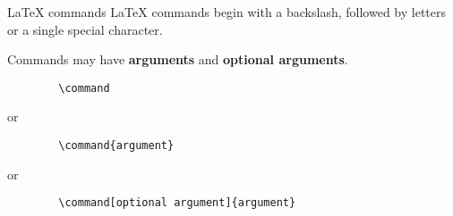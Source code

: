 \begin{frame}[fragile]{LaTeX commands}
    LaTeX commands begin with a backslash, followed by letters or a single special character.

    Commands may have \textbf{arguments} and \textbf{optional arguments}.

    \begin{verbatim}
        \command
    \end{verbatim}
    or
    \begin{verbatim}
        \command{argument}
    \end{verbatim}
    or
    \begin{verbatim}
        \command[optional argument]{argument}
    \end{verbatim}

\end{frame}